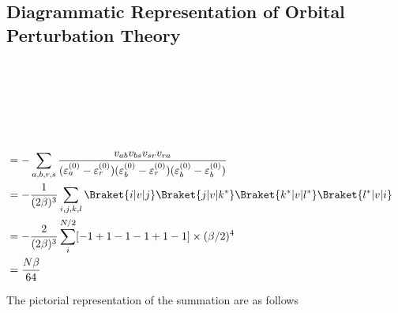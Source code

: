 \documentclass[a4paper]{article}
\begin{document}
\newpage
\subsection{Diagrammatic Representation of Orbital Perturbation Theory}
~\\
\begin{minipage}{0.2\linewidth}
		\hfill
	\\
	\vspace{25pt}\\
\end{minipage}
\begin{minipage}{0.8\linewidth}
	\vspace{25pt}~\\
	\begin{align}
	&= - \sum_{a,b,r,s} \dfrac{v_{ab}v_{bs}v_{sr}v_{ra}}{(\varepsilon_a^{(0)} - \varepsilon_r^{(0)})(\varepsilon_b^{(0)} - \varepsilon_r^{(0)})(\varepsilon_b^{(0)} - \varepsilon_b^{(0)})}  &\notag\\
	&= -\dfrac{1}{(2\beta)^3} \sum_{i,j,k,l} \Braket{i|v|j}\Braket{j|v|k^*}\Braket{k^*|v|l^*}\Braket{l^*|v|i} & \notag\\
	&= -\dfrac{2}{(2\beta)^3} \sum_i^{N/2} [-1 + 1 -1 -1 +1 -1]\times (\beta/2)^4  & \notag\\
	&= \dfrac{N\beta}{64}  & \notag\\
	\end{align}
\end{minipage}
The pictorial representation of the summation are as follows\\
\end{document}
